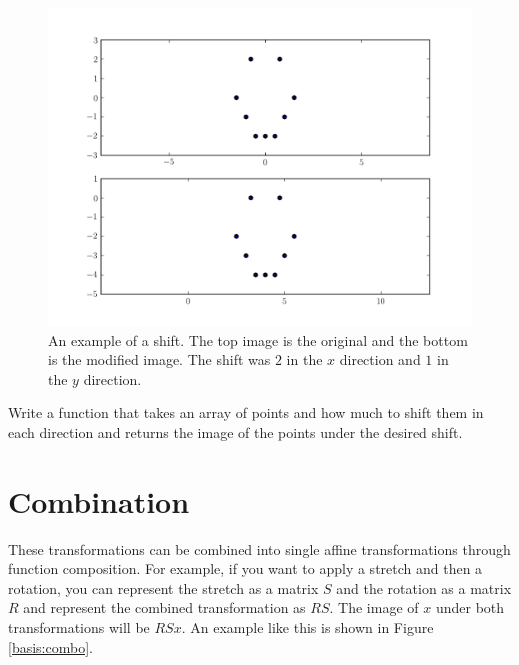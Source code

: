 \begin{figure}
\centering
\includegraphics[width=\textwidth]{shift.pdf}
\caption{
An example of a shift.
The top image is the original and the bottom is the modified image.
The shift was $2$ in the $x$ direction and $1$ in the $y$ direction.}
\end{figure}

\begin{problem}
Write a function that takes an array of points and how much to shift them in each direction and returns the image of the points under the desired shift.
\end{problem}

\section*{Combination}
These transformations can be combined into single affine transformations through function composition.
For example, if you want to apply a stretch and then a rotation, you can represent the stretch as a matrix $S$ and the rotation as a matrix $R$ and represent the combined transformation as $R S$.
The image of $x$ under both transformations will be $R S x$.
An example like this is shown in Figure \ref{basis:combo}.


